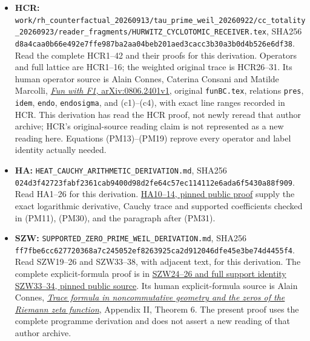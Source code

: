 \documentclass[
  10pt,
  a4paper,
]{article}
\providecommand{\tightlist}{%
  \setlength{\itemsep}{0pt}\setlength{\parskip}{0pt}}
\begin{document}
\begin{itemize}
\tightlist
\item
  \textbf{HCR:}
  \texttt{work/\allowbreak{}rh\_\allowbreak{}counterfactual\_\allowbreak{}20260913/\allowbreak{}tau\_\allowbreak{}prime\_\allowbreak{}weil\_\allowbreak{}20260922/\allowbreak{}cc\_\allowbreak{}totality\_\allowbreak{}20260923/\allowbreak{}reader\_\allowbreak{}fragments/\allowbreak{}HURWITZ\_\allowbreak{}CYCLOTOMIC\_\allowbreak{}RECEIVER.\allowbreak{}tex},
  SHA256
  \texttt{d8a4caa0\allowbreak{}b66e492e\allowbreak{}7ffe987b\allowbreak{}a2aa04be\allowbreak{}b201aed3\allowbreak{}cacc3b30\allowbreak{}a3b0d4b5\allowbreak{}26e6df38}.
  Read the complete HCR1--42 and their proofs for this derivation.
  Operators and full lattice are HCR1--16; the weighted original trace
  is HCR26--31. Its human operator source is Alain Connes, Caterina
  Consani and Matilde Marcolli,
  \href{https://arxiv.org/abs/0806.2401v1}{\emph{Fun with F1},
  arXiv:0806.2401v1}, original \texttt{funBC.\allowbreak{}tex}, relations
  \texttt{pres}, \texttt{idem}, \texttt{endo}, \texttt{endosigma}, and
  (c1)--(c4), with exact line ranges recorded in HCR. This derivation
  has read the HCR proof, not newly reread that author archive; HCR's
  original-source reading claim is not represented as a new reading
  here. Equations (PM13)--(PM19) reprove every operator and label
  identity actually needed.
\item
  \textbf{HA:} \texttt{HEAT\_\allowbreak{}CAUCHY\_\allowbreak{}ARITHMETIC\_\allowbreak{}DERIVATION.\allowbreak{}md}, SHA256
  \texttt{024d3f42\allowbreak{}723fabf2\allowbreak{}361cab94\allowbreak{}00d98d2f\allowbreak{}e64c57ec\allowbreak{}114112e6\allowbreak{}ada6f543\allowbreak{}0a88f909}.
  Read HA1--26 for this derivation.
  \href{https://github.com/KokunoYumeto/zeta-function-research-reader/blob/76f421965914beb133df797835f940849844dc4f/workbenches/splitzero-tandem/branches/tau-zero-prime-positivity/HEAT_CAUCHY_ARITHMETIC_DERIVATION.md}{HA10--14,
  pinned public proof} supply the exact logarithmic derivative, Cauchy
  trace and supported coefficients checked in (PM11), (PM30), and the
  paragraph after (PM31).
\item
  \textbf{SZW:} \texttt{SUPPORTED\_\allowbreak{}ZERO\_\allowbreak{}PRIME\_\allowbreak{}WEIL\_\allowbreak{}DERIVATION.\allowbreak{}md},
  SHA256
  \texttt{ff7fbe6c\allowbreak{}c6277203\allowbreak{}68a7c245\allowbreak{}052ef826\allowbreak{}3925ca2d\allowbreak{}912046df\allowbreak{}e45e3be7\allowbreak{}4d4455f4}.
  Read SZW19--26 and SZW33--38, with adjacent text, for this derivation.
  The complete explicit-formula proof is in
  \href{https://github.com/KokunoYumeto/zeta-function-research-reader/blob/5a89872598df0902b7c1393cf8e4692ca3010a95/workbenches/splitzero-tandem/branches/tau-zero-prime-positivity/SUPPORTED_ZERO_PRIME_WEIL_DERIVATION.md}{SZW24--26
  and full support identity SZW33--34, pinned public source}. Its human
  explicit-formula source is Alain Connes,
  \href{https://arxiv.org/abs/math/9811068}{\emph{Trace formula in
  noncommutative geometry and the zeros of the Riemann zeta function}},
  Appendix II, Theorem 6. The present proof uses the complete programme
  derivation and does not assert a new reading of that author archive.
\end{itemize}
\end{document}
